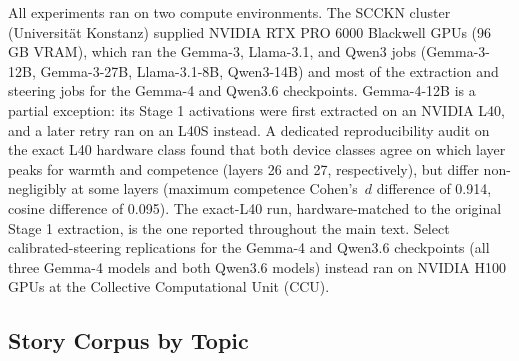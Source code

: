 \documentclass[twocolumn]{article}
\begin{document}
\begin{appendices}
All experiments ran on two compute environments.
The SCCKN cluster (Universit\"at Konstanz) supplied NVIDIA RTX PRO 6000
Blackwell GPUs (96 GB VRAM), which ran the Gemma-3, Llama-3.1, and Qwen3
jobs (Gemma-3-12B, Gemma-3-27B, Llama-3.1-8B, Qwen3-14B) and most of the
extraction and steering jobs for the Gemma-4 and Qwen3.6 checkpoints.
Gemma-4-12B is a partial exception: its Stage 1 activations were first
extracted on an NVIDIA L40, and a later retry ran on an L40S instead.
A dedicated reproducibility audit on the exact L40 hardware class found
that both device classes agree on which layer peaks for warmth and
competence (layers 26 and 27, respectively), but differ non-negligibly at
some layers (maximum competence Cohen's~$d$ difference of 0.914, cosine
difference of 0.095).
The exact-L40 run, hardware-matched to the original Stage 1 extraction, is
the one reported throughout the main text.
Select calibrated-steering replications for the Gemma-4 and Qwen3.6
checkpoints (all three Gemma-4 models and both Qwen3.6 models) instead ran
on NVIDIA H100 GPUs at the Collective Computational Unit (CCU).
\subsection*{Story Corpus by Topic}


\end{appendices}
\end{document}
